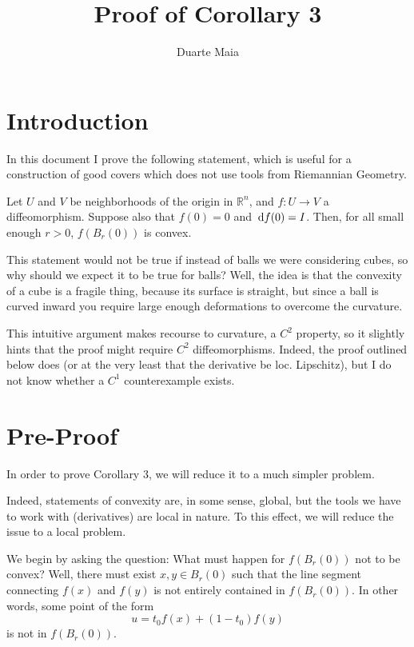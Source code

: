 \documentclass{article}
\title{Proof of Corollary 3}
\author{Duarte Maia}
\theoremstyle{nonumberplain}
\newcommand{\R}{\mathbb{R}}
\newcommand{\corthree}{Corollary 3}
\begin{document}
\maketitle

\section{Introduction}

In this document I prove the following statement, which is useful for a construction of good covers which does not use tools from Riemannian Geometry.

\begin{prop*}[\corthree]
Let $U$ and $V$ be neighborhoods of the origin in $\R^n$, and $f \colon U \to V$ a diffeomorphism. Suppose also that $f(0) = 0$ and $\dl f(0) = I$. Then, for all small enough $r > 0$, $f(B_r(0))$ is convex.
\end{prop*}

This statement would not be true if instead of balls we were considering cubes, so why should we expect it to be true for balls? Well, the idea is that the convexity of a cube is a fragile thing, because its surface is straight, but since a ball is curved inward you require large enough deformations to overcome the curvature.

This intuitive argument makes recourse to curvature, a $C^2$ property, so it slightly hints that the proof might require $C^2$ diffeomorphisms. Indeed, the proof outlined below does (or at the very least that the derivative be loc. Lipschitz), but I do not know whether a $C^1$ counterexample exists.

\section{Pre-Proof}

In order to prove \corthree, we will reduce it to a much simpler problem.

Indeed, statements of convexity are, in some sense, global, but the tools we have to work with (derivatives) are local in nature. To this effect, we will reduce the issue to a local problem.

We begin by asking the question: What must happen for $f(B_r(0))$ not to be convex? Well, there must exist $x, y \in B_r(0)$ such that the line segment connecting $f(x)$ and $f(y)$ is not entirely contained in $f(B_r(0))$. In other words, some point of the form
\[u = t_0 f(x) + (1-t_0) f(y)\]
is not in $f(B_r(0))$.
\end{document}
